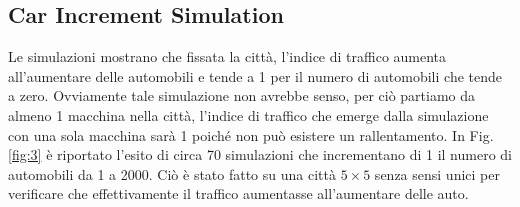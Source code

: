\documentclass[main.tex]{subfiles}
\begin{document}
    
    \subsection{Car Increment Simulation}
        Le simulazioni mostrano che fissata la città, l'indice di traffico aumenta all'aumentare delle automobili
        e tende a 1 per il numero di automobili che tende a zero. Ovviamente tale simulazione non avrebbe senso, per ciò 
        partiamo da almeno 1 macchina nella città, l'indice di traffico che emerge dalla simulazione con una sola macchina
        sarà 1 poiché non può esistere un rallentamento.
        In Fig. \ref{fig:3} è riportato l'esito di circa 70 simulazioni che incrementano di 1 il numero di automobili da 1 a 2000.
        Ciò è stato fatto su una città $5 \times 5$ senza sensi unici per verificare che effettivamente il traffico aumentasse
        all'aumentare delle auto.
\end{document}
